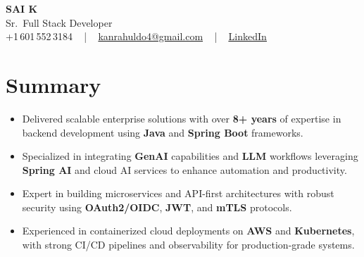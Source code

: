 \documentclass[letterpaper,11pt]{article}
\newcommand{\resumeItem}[1]{
  \item\footnotesize{
    {#1 \vspace{-2pt}}
  }
}
\newcommand{\resumeItemListStart}{\begin{itemize}[leftmargin=*]}
\newcommand{\resumeItemListEnd}{\end{itemize}\vspace{-5pt}}
\begin{document}
\begin{center}
    {\fontsize{14pt}{12pt}\selectfont \textbf{\MakeUppercase{Sai K}}}\\ \vspace{2pt}
    \fontsize{10pt}{12pt}\selectfont Sr.\ Full Stack Developer\\ \vspace{2pt}
    \fontsize{10pt}{12pt}\selectfont +1\,601\,552\,3184 ~ | ~
    \href{mailto:kanrahuldo4@gmail.com}{kanrahuldo4@gmail.com} ~ | ~
    \href{https://www.linkedin.com/in/srrrk/}{\color{blue}\underline{LinkedIn}}
    \vspace{-10pt}
\end{center}

\section{Summary}
\fontsize{9pt}{10pt}\selectfont
\resumeItemListStart
  \resumeItem{Delivered scalable enterprise solutions with over \textbf{8+ years} of expertise in backend development using \textbf{Java} and \textbf{Spring Boot} frameworks.}
  \resumeItem{Specialized in integrating \textbf{GenAI} capabilities and \textbf{LLM} workflows leveraging \textbf{Spring AI} and cloud AI services to enhance automation and productivity.}
  \resumeItem{Expert in building microservices and API-first architectures with robust security using \textbf{OAuth2/OIDC}, \textbf{JWT}, and \textbf{mTLS} protocols.}
  \resumeItem{Experienced in containerized cloud deployments on \textbf{AWS} and \textbf{Kubernetes}, with strong CI/CD pipelines and observability for production-grade systems.}
\resumeItemListEnd
\vspace{-6pt}

\end{document}
